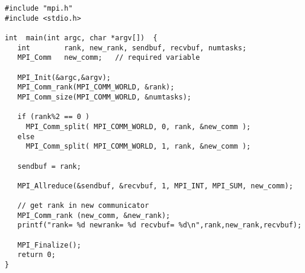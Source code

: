 \documentclass[11pt,a4paper]{article}
\begin{document}
\begin{lstlisting}
#include "mpi.h"
#include <stdio.h>

int  main(int argc, char *argv[])  {
   int        rank, new_rank, sendbuf, recvbuf, numtasks;
   MPI_Comm   new_comm;   // required variable

   MPI_Init(&argc,&argv);
   MPI_Comm_rank(MPI_COMM_WORLD, &rank);
   MPI_Comm_size(MPI_COMM_WORLD, &numtasks);

   if (rank%2 == 0 )
     MPI_Comm_split( MPI_COMM_WORLD, 0, rank, &new_comm );
   else
     MPI_Comm_split( MPI_COMM_WORLD, 1, rank, &new_comm );

   sendbuf = rank;

   MPI_Allreduce(&sendbuf, &recvbuf, 1, MPI_INT, MPI_SUM, new_comm);

   // get rank in new communicator
   MPI_Comm_rank (new_comm, &new_rank);
   printf("rank= %d newrank= %d recvbuf= %d\n",rank,new_rank,recvbuf);

   MPI_Finalize();
   return 0;
}
\end{lstlisting}
\end{document}

